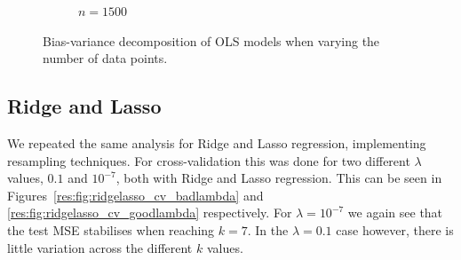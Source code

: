 \documentclass[twocolumn,english,notitlepage]{article}
\begin{document}
\begin{figure}[ht]
\begin{subfigure}{.5\textwidth}
                    \caption{$n=1500$}
                \end{subfigure}
                \caption{Bias-variance decomposition of OLS models when varying the number of data points.}
                \label{res:fig:bs_bias_var_data_points}
            \end{figure}
    

    \subsection{Ridge and Lasso}
        We repeated the same analysis for Ridge and Lasso regression, implementing resampling techniques. For cross-validation this was done for two different $\lambda$ values, $0.1$ and $10^{-7}$, both with Ridge and Lasso regression. This can be seen in Figures~\ref{res:fig:ridgelasso_cv_badlambda} and \ref{res:fig:ridgelasso_cv_goodlambda} respectively. For $\lambda = 10^{-7}$ we again see that the test MSE stabilises when reaching $k=7$. In the $\lambda=0.1$ case however, there is little variation across the different $k$ values.
\end{document}
